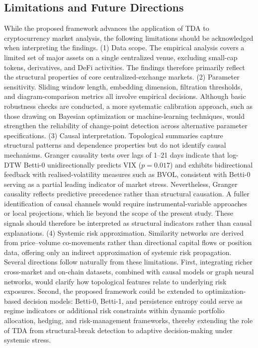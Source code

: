 \documentclass[11pt,reqno]{amsart}
\numberwithin{equation}{section} %
\begin{document}
\subsection{Limitations and Future Directions}
While the proposed framework advances the application of TDA to cryptocurrency market analysis, the following limitations should be acknowledged when interpreting the findings.
(1) Data scope.
The empirical analysis covers a limited set of major assets on a single centralized venue, excluding small-cap tokens, derivatives, and DeFi 
activities. 
The findings therefore primarily reflect the structural properties of core centralized-exchange markets.
(2) Parameter sensitivity.
Sliding window length, embedding dimension, filtration thresholds, and diagram-comparison metrics all involve empirical decisions. 
Although basic robustness checks are conducted, a more systematic 
calibration approach, such as those drawing on Bayesian optimization or machine-learning techniques, would strengthen the reliability of change-point detection across alternative parameter specifications.
(3) Causal interpretation.
Topological summaries capture structural patterns and dependence properties but do not identify causal mechanisms. Granger causality tests over lags of 1--21 days indicate that log-DTW Betti-0 unidirectionally predicts VIX (\(p = 0.017\)) and exhibits bidirectional feedback with realised-volatility measures such as BVOL, consistent with Betti-0 serving as a partial leading indicator of market stress. 
Nevertheless, Granger causality reflects predictive precedence rather than structural causation. A fuller identification of causal channels would require instrumental-variable approaches or local projections, which lie beyond the scope of the present study. These signals should therefore be interpreted as structural indicators rather than causal explanations.
(4) Systemic risk approximation.
Similarity networks are derived from price–volume co-movements rather than directional capital flows or position data, offering only an indirect approximation of systemic risk propagation.
\noindent Several directions follow naturally from these limitations. 
First, integrating richer cross-market and on-chain datasets, combined with causal models or graph neural networks, would clarify how topological features relate to underlying risk exposures. Second, the proposed framework could be extended to optimization-based decision models: 
Betti-0, Betti-1, and persistence entropy could serve as regime indicators or additional risk constraints within dynamic portfolio allocation, hedging, and risk-management frameworks, thereby extending the role of TDA from structural-break detection to adaptive decision-making under systemic stress.
\end{document}

